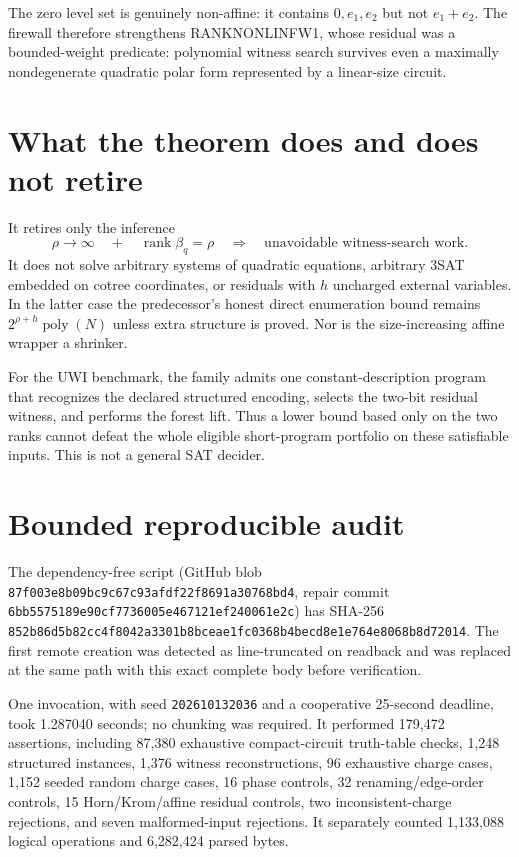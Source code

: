 \documentclass[11pt]{article}
\begin{document}
The zero level set is genuinely non-affine: it contains $0,e_1,e_2$ but not
$e_1+e_2$.  The firewall therefore strengthens RANKNONLINFW1, whose residual
was a bounded-weight predicate: polynomial witness search survives even a
maximally nondegenerate quadratic polar form represented by a linear-size
circuit.

\section{What the theorem does and does not retire}
It retires only the inference
\[
 \rho\to\infty\quad+\quad \operatorname{rank}\beta_q=\rho
 \quad\Longrightarrow\quad\text{unavoidable witness-search work}.       \tag{3}
\]
It does not solve arbitrary systems of quadratic equations, arbitrary 3SAT
embedded on cotree coordinates, or residuals with $h$ uncharged external
variables.  In the latter case the predecessor's honest direct enumeration
bound remains $2^{\rho+h}\operatorname{poly}(N)$ unless extra structure is
proved.  Nor is the size-increasing affine wrapper a shrinker.

For the UWI benchmark, the family admits one constant-description program
that recognizes the declared structured encoding, selects the two-bit
residual witness, and performs the forest lift.  Thus a lower bound based only
on the two ranks cannot defeat the whole eligible short-program portfolio on
these satisfiable inputs.  This is not a general SAT decider.

\section{Bounded reproducible audit}
The dependency-free script
(GitHub blob \texttt{87f003e8b09bc9c67c93afdf22f8691a30768bd4}, repair commit
\texttt{6bb5575189e90cf7736005e467121ef240061e2c}) has SHA-256
\texttt{852b86d5b82cc4f8042a3301b8bceae1fc0368b4becd8e1e764e8068b8d72014}.
The first remote creation was detected as line-truncated on readback and was
replaced at the same path with this exact complete body before verification.

One invocation, with seed \texttt{202610132036} and a cooperative 25-second
deadline, took 1.287040 seconds; no chunking was required.  It performed
179,472 assertions, including 87,380 exhaustive compact-circuit truth-table
checks, 1,248 structured instances, 1,376 witness reconstructions, 96
exhaustive charge cases, 1,152 seeded random charge cases, 16 phase controls,
32 renaming/edge-order controls, 15 Horn/Krom/affine residual controls, two
inconsistent-charge rejections, and seven malformed-input rejections.  It
separately counted 1,133,088 logical operations and 6,282,424 parsed bytes.
\end{document}
